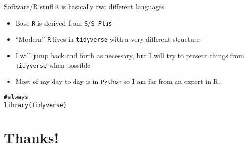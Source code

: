 \documentclass[aspectratio=169]{beamer}
\begin{document}
\begin{frame}[fragile]{Software/R stuff}
\texttt{R} is basically two different languages
\begin{itemize}
\item Base \texttt{R} is derived from \texttt{S/S-Plus}
\item ``Modern'' \texttt{R} lives in \texttt{tidyverse} with a very different structure
\item I will jump back and forth as necessary, but I will try to present things from \texttt{tidyverse} when possible
\item Most of my day-to-day is in \texttt{Python} so I am far from an expert in R.
\end{itemize}
\begin{verbatim}
#always
library(tidyverse)
\end{verbatim}
\end{frame}


\section*{Thanks!}
\end{document}
